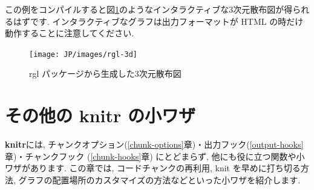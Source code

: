\documentclass[
  11pt,
  lualatex,ja=standard,jafont=noto]{bxjsreport}
\newenvironment{Shaded}{\begin{snugshade}}{\end{snugshade}}
\newcommand{\AnnotationTok}[1]{\textcolor[rgb]{0.56,0.35,0.01}{\textbf{\textit{#1}}}}
\newcommand{\CommentTok}[1]{\textcolor[rgb]{0.56,0.35,0.01}{\textit{#1}}}
\newcommand{\InformationTok}[1]{\textcolor[rgb]{0.56,0.35,0.01}{\textbf{\textit{#1}}}}
\newcommand{\NormalTok}[1]{#1}
\begin{document}
\begin{Shaded}
\end{Shaded}

この例をコンパイルすると図\ref{fig:rgl-3d}のようなインタラクティブな3次元散布図が得られるはずです. インタラクティブなグラフは出力フォーマットが HTML の時だけ動作することに注意してください.

\begin{figure}

{\centering \texttt{[image: JP/images/rgl-3d]} 

}

\caption{rgl パッケージから生成した3次元散布図}\label{fig:rgl-3d}
\end{figure}

\hypertarget{knitr-misc}{%
\chapter{その他の knitr の小ワザ}\label{knitr-misc}}

\textbf{knitr}には, チャンクオプション(\ref{chunk-options}章)・出力フック(\ref{output-hooks}章)・チャンクフック (\ref{chunk-hooks}章) にとどまらず, 他にも役に立つ関数や小ワザがあります. この章では, コードチャンクの再利用, knit を早めに打ち切る方法, グラフの配置場所のカスタマイズの方法などといった小ワザを紹介します.
\end{document}
